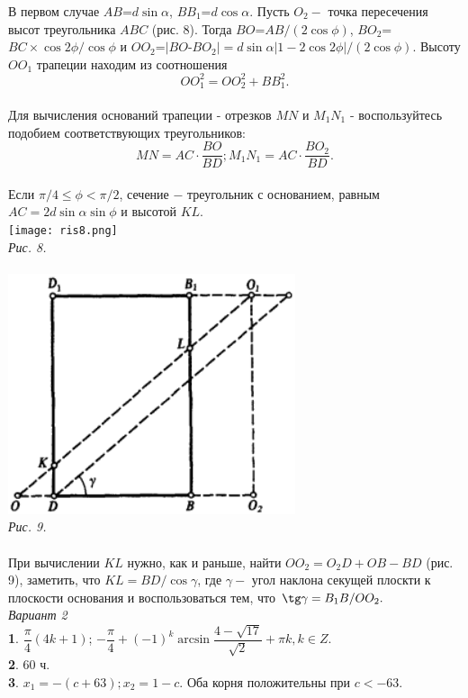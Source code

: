 \begin{multicols}{2}
В первом случае $AB$=$d\sin\alpha$, $BB_{1}$=$d\cos\alpha$. Пусть $O_{2} -$ точка пересечения высот треугольника $ABC$ (рис. 8). Тогда $BO$=$AB/(2\cos\phi)$, $BO_{2}$=$BC\times\cos 2\phi/\cos\phi$ и $OO_{2}$=$|BO$-$BO_{2}|=
d\sin\alpha|1-2\cos 2\phi|/(2\cos\phi)$. Высоту $OO_{1}$ трапеции находим из соотношения \\
$$OO_{1}^{2}=OO_{2}^{2}+BB_{1}^{2}.$$\\
Для вычисления оснований трапеции - отрезков $MN$ и $M_{1}N_{1}$ - воспользуйтесь подобием соответствующих треугольников: \\
$$MN=AC\cdot\dfrac{BO}{BD};  M_{1}N_{1}=AC\cdot\dfrac{BO_{2}}{BD}.$$\\
Если $\pi/4\leq\phi<\pi/2$, сечение $-$ треугольник с основанием, равным $AC=2d\sin\alpha\sin\phi$ и высотой $KL$.\\
\texttt{[image: ris8.png]}\\
\textit{Рис. 8.}\\
\columnbreak
\\
\includegraphics[scale=0.8]{pictures/ris9.png}\\
\textit{Рис. 9.}\\\\
При вычислении $KL$ нужно, как и раньше, найти $OO_{2}=O_{2}D+OB-BD$ (рис. 9), заметить, что $KL=BD/\cos\gamma$, где $\gamma -$ угол наклона секущей плоскти к плоскости основания и воспользоваться тем, что $\tg\gamma=B_{1}B/OO_{2}.$\\
\large{\textit{Вариант 2}}
\\
\textbf{1}. $\dfrac{\pi}{4}(4k+1)$; $-\dfrac{\pi}{4}+(-1)^{k}\arcsin\dfrac{4-\sqrt{17}}{\sqrt{2}}+\pi k, k \in Z$.\\
\textbf{2}. 60 ч.\\
\textbf{3}. $x_{1}=-(c+63); x_{2}=1-c$. Оба корня положительны при $c<-63$.\\

\end{multicols}
